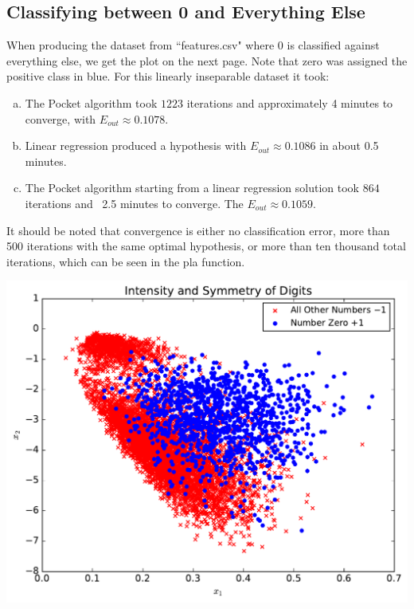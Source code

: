 \documentclass[a4paper]{article}
\begin{document}
\begin{doublespace}

\subsection{Classifying between 0 and Everything Else}

When producing the dataset from ``features.csv" where $0$ is classified against everything else, we get the plot on the next page. Note that zero was assigned the positive class in blue. For this linearly inseparable dataset it took:

\begin{enumerate}[(a)]
\item The Pocket algorithm took $1223$ iterations and approximately 4 minutes to converge, with $E_{out} \approx 0.1078$.
\item Linear regression produced a hypothesis with $E_{out} \approx 0.1086$ in about 0.5 minutes.
\item The Pocket algorithm starting from a linear regression solution took $864$ iterations and ~2.5 minutes to converge. The $E_{out} \approx 0.1059$.
\end{enumerate}

It should be noted that convergence is either no classification error, more than 500 iterations with the same optimal hypothesis, or more than ten thousand total iterations, which can be seen in the pla function.



\begin{center}
	\includegraphics[scale =0.65]{By_Zero/midterm_plot.pdf}
\end{center}


\end{doublespace}
\end{document}
